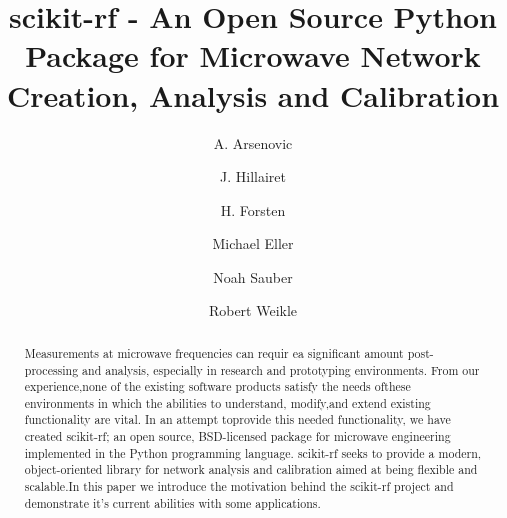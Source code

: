 \documentclass{IEEEjmw}
\begin{document}

\title{scikit-rf - An Open Source Python Package for Microwave Network Creation, Analysis and Calibration} 


\author{A. Arsenovic}

\author{J. Hillairet}


\author{H. Forsten}

\author{Michael Eller}

\author{Noah Sauber}

\author{Robert Weikle}






\begin{abstract}
Measurements at microwave frequencies can requir ea  significant  amount post-processing  and  analysis,  especially  in research  and  prototyping environments.  From  our  experience,none   of   the   existing   software   products  satisfy   the   needs   ofthese environments in which the abilities to understand, modify,and  extend  existing  functionality  are  vital.  In  an  attempt  toprovide this  needed  functionality,  we  have  created  scikit-rf;  an open  source,  BSD-licensed  package  for  microwave  engineering implemented   in   the   Python  programming   language.   scikit-rf seeks  to  provide  a  modern,  object-oriented  library  for  network analysis  and  calibration  aimed  at  being  flexible  and scalable.In  this  paper  we  introduce  the  motivation  behind  the  scikit-rf  project   and   demonstrate   it’s  current   abilities   with   some applications.
\end{abstract}

\begin{IEEEkeywords}

\end{IEEEkeywords}
\end{document}
